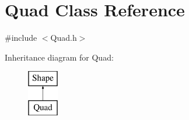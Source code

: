 \hypertarget{class_quad}{}\section{Quad Class Reference}
\label{class_quad}


{\ttfamily \#include $<$Quad.\+h$>$}

Inheritance diagram for Quad\+:\begin{figure}[H]
\begin{center}
\leavevmode
\includegraphics[height=2.000000cm]{class_quad}
\end{center}
\end{figure}
